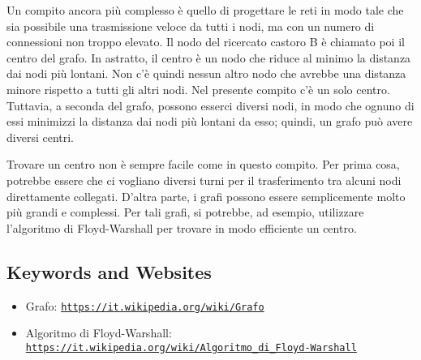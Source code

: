 \documentclass[a4paper,11pt]{report}
\newcommand{\BrochureUrlText}[1]{\texttt{#1}}
\begin{document}
Un compito ancora più complesso è quello di progettare le reti in modo tale che sia possibile una trasmissione veloce da tutti i nodi, ma con un numero di connessioni non troppo elevato.
Il nodo del ricercato castoro B è chiamato poi il centro del grafo. In astratto, il centro è un nodo che riduce al minimo la distanza dai nodi più lontani. Non c’è quindi nessun altro nodo che avrebbe una distanza minore rispetto a tutti gli altri nodi. Nel presente compito c’è un solo centro. Tuttavia, a seconda del grafo, possono esserci diversi nodi, in modo che ognuno di essi minimizzi la distanza dai nodi più lontani da esso; quindi, un grafo può avere diversi centri.

Trovare un centro non è sempre facile come in questo compito. Per prima cosa, potrebbe essere che ci vogliano diversi turni per il trasferimento tra alcuni nodi direttamente collegati. D’altra parte, i grafi possono essere semplicemente molto più grandi e complessi. Per tali grafi, si potrebbe, ad esempio, utilizzare l’algoritmo di Floyd-Warshall per trovare in modo efficiente un centro.

{\raggedright

\subsection*{Keywords and Websites}

\begin{itemize}
  \item Grafo: \href{https://it.wikipedia.org/wiki/Grafo}{\BrochureUrlText{https://it.wikipedia.org/wiki/Grafo}}
  \item Algoritmo di Floyd-Warshall: \href{https://it.wikipedia.org/wiki/Algoritmo_di_Floyd-Warshall}{\BrochureUrlText{https://it.wikipedia.org/wiki/Algoritmo\_di\_Floyd-Warshall}}
\end{itemize}


}
\end{document}
